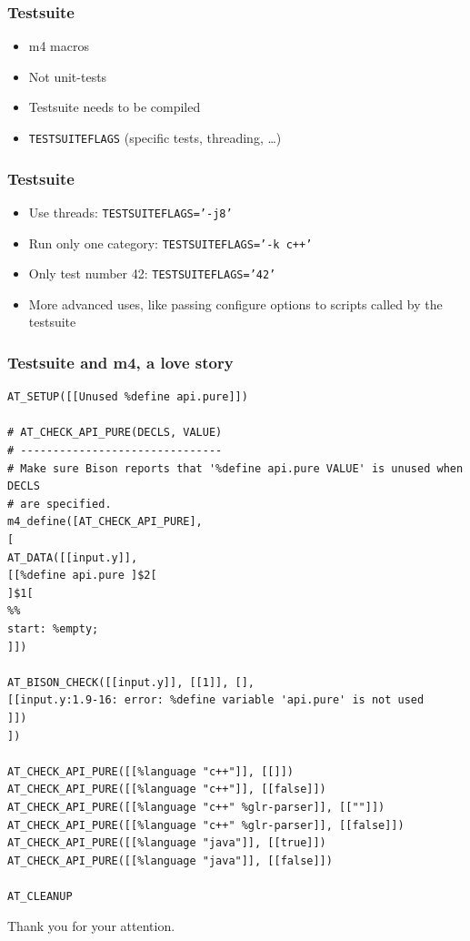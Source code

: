\documentclass{beamer}
\begin{document}
\begin{frame}
  \frametitle{Testsuite}
    \begin{itemize}
      \item m4 macros
      \item Not unit-tests
      \item Testsuite needs to be compiled
      \item \texttt{TESTSUITEFLAGS} (specific tests, threading, \ldots)
    \end{itemize}
\end{frame}

\begin{frame}
  \frametitle{Testsuite}
    \begin{itemize}
      \item Use threads: \texttt{TESTSUITEFLAGS='-j8'}
      \item Run only one category: \texttt{TESTSUITEFLAGS='-k c++'}
      \item Only test number 42: \texttt{TESTSUITEFLAGS='42'}
      \item More advanced uses, like passing configure options to scripts
        called by the testsuite
    \end{itemize}
\end{frame}

\begin{frame}[fragile,shrink=25]
  \frametitle{Testsuite and m4, a love story}
\begin{verbatim}
AT_SETUP([[Unused %define api.pure]])

# AT_CHECK_API_PURE(DECLS, VALUE)
# -------------------------------
# Make sure Bison reports that '%define api.pure VALUE' is unused when DECLS
# are specified.
m4_define([AT_CHECK_API_PURE],
[
AT_DATA([[input.y]],
[[%define api.pure ]$2[
]$1[
%%
start: %empty;
]])

AT_BISON_CHECK([[input.y]], [[1]], [],
[[input.y:1.9-16: error: %define variable 'api.pure' is not used
]])
])

AT_CHECK_API_PURE([[%language "c++"]], [[]])
AT_CHECK_API_PURE([[%language "c++"]], [[false]])
AT_CHECK_API_PURE([[%language "c++" %glr-parser]], [[""]])
AT_CHECK_API_PURE([[%language "c++" %glr-parser]], [[false]])
AT_CHECK_API_PURE([[%language "java"]], [[true]])
AT_CHECK_API_PURE([[%language "java"]], [[false]])

AT_CLEANUP
\end{verbatim}
\end{frame}

\begingroup
{}
\begin{frame}
    \begin{center}
        \vspace{1cm}
        {\Huge\color{black} { Thank you for your attention.}}
    \end{center}
\end{frame}
\endgroup
\end{document}

